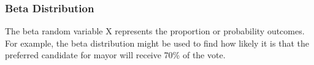 \documentclass[compress]{beamer}
\begin{document}
\begin{frame}\frametitle{Beta Distribution}
The beta random variable X represents the proportion or probability
outcomes. For example, the beta distribution might be used to find
how likely it is that the preferred candidate for mayor will receive 70\% of the vote.

\end{frame}
\end{document}

